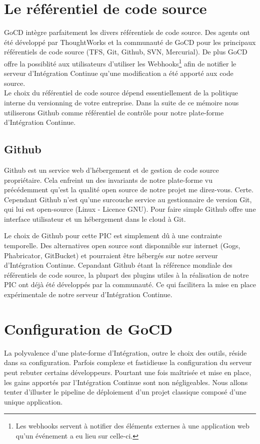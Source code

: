     \section{Le référentiel de code source}\label{Repository}
    GoCD intègre parfaitement les divers référentiels de code source. Des agents ont été développé par ThoughtWorks et la communauté de GoCD pour les principaux référentiels de code source (TFS, Git, Github, SVN, Mercurial). De plus GoCD offre la possiblité aux utilisateurs d'utiliser les Webhooks\footnote{Les webhooks servent à notifier des éléments externes à une application web qu'un événement a eu lieu sur celle-ci.} afin de notifier le serveur d'Intégration Continue qu'une modification a été apporté aux code source.\\

    Le choix du référentiel de code source dépend essentiellement de la politique interne du versionning de votre entreprise. Dans la suite de ce mémoire nous utiliserons Github comme référentiel de contrôle pour notre plate-forme d'Intégration Continue.

      \subsection{Github}
      Github est un service web d'hébergement et de gestion de code source propriétaire. Cela enfreint un des invariants de notre plate-forme vu précédemment qu'est la qualité open source de notre projet me direz-vous. Certe. Cependant Github n'est qu'une surcouche service au gestionnaire de version Git, qui lui est open-source (Linux - Licence GNU). Pour faire simple Github offre une interface utilisateur et un hébergement dans le cloud à Git.

      Le choix de Github pour cette PIC est simplement dû à une contrainte temporelle. Des alternatives open source sont disponnible sur internet (Gogs, Phabricator, GitBucket) et pourraient être hébergés sur notre serveur d'Intégration Continue. Cepandant Github étant la référence mondiale des référentiels de code source, la plupart des plugins utiles à la réalisation de notre PIC ont déjà été développés par la communauté. Ce qui facilitera la mise en place expérimentale de notre serveur d'Intégration Continue.

    \section{Configuration de GoCD}
    La polyvalence d'une plate-forme d'Intégration, outre le choix des outils, réside dans sa configuration. Parfois complexe et fastidieuse la configuration du serveur peut rebuter certains développeurs. Pourtant une fois maîtrisée et mise en place, les gains apportés par l'Intégration Continue sont non négligeables. Nous allons tenter d'illuster le pipeline de déploiement d'un projet classique composé d'une unique application.

